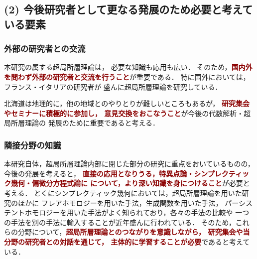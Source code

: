 \documentclass[11pt,a4paper,uplatex,dvipdfmx]{ujarticle} 		%
\newcommand{\研究課題名}{打切り超局所台の関手的性質の研究とMorse理論への応用}
\newcommand{\研究機関名}{北海道大学}
\newcommand{\研究代表者氏名}{大柴寿浩}
\begin{document}
\subsection*{(2) 今後研究者として更なる発展のため必要と考えている要素}
\subsubsection*{外部の研究者との交流}
本研究の属する超局所層理論は，
必要な知識も応用も広い．
そのため，\textcolor{darkred}{\textbf{国内外を問わず外部の研究者と交流を行うこと}}が重要である．
特に国外においては，フランス・イタリアの研究者が
盛んに超局所層理論を研究している．

北海道は地理的に，他の地域とのやりとりが難しいところもあるが，
\textcolor{darkred}{\textbf{研究集会やセミナーに積極的に参加し，
意見交換をおこなうこと}}が今後の代数解析・超局所層理論の
発展のために重要であると考える．

\subsubsection*{隣接分野の知識}
本研究自体，超局所層理論内部に閉じた部分の研究に重点をおいているものの，
今後の発展を考えると，
\textcolor{darkred}{\textbf{直接の応用となりうる，特異点論・シンプレクティック幾何・偏微分方程式論に
について，より深い知識を身につけること}}が必要と考える．
とくにシンプレクティック幾何においては，超局所層理論を用いた研究のほかに
フレアホモロジーを用いた手法，生成関数を用いた手法，
パーシステントホモロジーを用いた手法がよく知られており，各々の手法の比較や
一つの手法を別の手法に輸入することが近年盛んに行われている．
そのため，これらの分野について，\textcolor{darkred}{\textbf{超局所層理論とのつながりを意識しながら，
研究集会や当分野の研究者との対話を通じて，
主体的に学習することが必要}}であると考えている．




\end{document}
